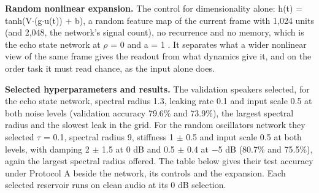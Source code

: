 \documentclass{article}
\begin{document}
\textbf{Random nonlinear expansion.} The control for dimensionality
alone: h(t) = tanh(V\ensuremath{\cdot}(g\ensuremath{\cdot}u(t)) + b), a
random feature map of the current frame with 1,024 units (and 2,048, the
network's signal count), no recurrence and no memory, which is the echo
state network at \ensuremath{\rho} = 0 and a = 1
\citep{rahimi2007, huang2006}. It separates what a wider nonlinear view
of the same frame gives the readout from what dynamics give it, and on
the order task it must read chance, as the input alone does.

\textbf{Selected hyperparameters and results.} The validation speakers
selected, for the echo state network, spectral radius 1.3, leaking rate
0.1 and input scale 0.5 at both noise levels (validation accuracy 79.6\%
and 73.9\%), the largest spectral radius and the slowest leak in the
grid. For the random oscillators network they selected \ensuremath{\tau}
= 0.1, spectral radius 9, stiffness 1 \ensuremath{\pm} 0.5 and input
scale 0.5 at both levels, with damping 2 \ensuremath{\pm} 1.5 at 0 dB
and 0.5 \ensuremath{\pm} 0.4 at \ensuremath{-}5 dB (80.7\% and 75.5\%),
again the largest spectral radius offered. The table below gives their
test accuracy under Protocol A beside the network, its controls and the
expansion. Each selected reservoir runs on clean audio at its 0 dB
selection.
\end{document}
